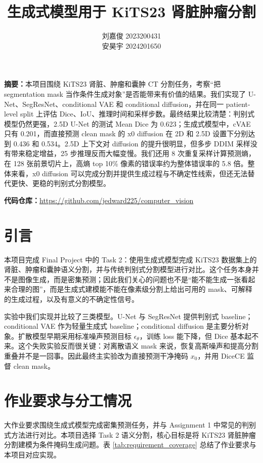\documentclass[lang=cn,11pt,a4paper]{elegantpaper}
\title{生成式模型用于 KiTS23 肾脏肿瘤分割}
\author{刘嘉俊 2023200431 \\ 安昊宇 2024201650}
\institute{中国人民大学}
\begin{document}
\maketitle

\noindent\textbf{摘要：}本项目围绕 KiTS23 肾脏、肿瘤和囊肿 CT 分割任务，考察“把 segmentation mask 当作条件生成对象”是否能带来有价值的结果。我们实现了 U-Net、SegResNet、conditional VAE 和 conditional diffusion，并在同一 patient-level split 上评估 Dice、IoU、推理时间和采样步数。最终结果比较清楚：判别式模型仍然更强，2.5D U-Net 的测试 Mean Dice 为 0.623；生成式模型中，cVAE 只有 0.201，而直接预测 clean mask 的 x0 diffusion 在 2D 和 2.5D 设置下分别达到 0.436 和 0.534。2.5D 上下文对 diffusion 的提升很明显，但多步 DDIM 采样没有带来稳定增益，25 步推理反而大幅变慢。我们还用 8 次重复采样计算预测熵，在 128 张前景切片上，高熵 top 10\% 像素的错误率约为整体错误率的 5.8 倍。整体来看，x0 diffusion 可以完成分割并提供生成过程与不确定性线索，但还无法替代更快、更稳的判别式分割模型。

\vspace{0.5em}
\noindent\textbf{代码仓库：}\url{https://github.com/jedward225/computer_vision}

\section{引言}

本项目完成 Final Project 中的 Task 2：使用生成式模型完成 KiTS23 数据集上的肾脏、肿瘤和囊肿语义分割，并与传统判别式分割模型进行对比。这个任务本身并不是图像生成，而是密集预测；因此我们关心的问题也不是“能不能生成一张看起来合理的图”，而是生成式建模能不能在像素级分割上给出可用的 mask、可解释的生成过程，以及有意义的不确定性信号。

实验中我们实现并比较了三类模型。U-Net 与 SegResNet 提供判别式 baseline；conditional VAE 作为轻量生成式 baseline；conditional diffusion 是主要分析对象。扩散模型早期采用标准噪声预测目标 $\epsilon_\theta$，训练 loss 能下降，但 Dice 基本起不来。这个失败实验反而很关键：对离散语义 mask 来说，恢复高斯噪声和提高分割重叠并不是一回事。因此最终主实验改为直接预测干净掩码 $x_0$，并用 DiceCE 监督 clean mask。

\section{作业要求与分工情况}

大作业要求围绕生成式模型完成密集预测任务，并与 Assignment 1 中常见的判别式方法进行对比。本项目选择 Task 2 语义分割，核心目标是将 KiTS23 肾脏肿瘤分割建模为条件掩码生成问题。表 \ref{tab:requirement_coverage} 总结了作业要求与本项目对应实现。
\end{document}

